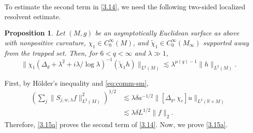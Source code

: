 \documentclass[11pt]{amsart}
\newcommand{\la}{\lambda}
\newtheorem{proposition}{Proposition}[section]
\begin{document}
To estimate the second term in \eqref{3.14}, we need the following two-sided localized resolvent estimate.
\begin{proposition}\label{keyeuc}
Let $(M,g)$ be an asymptotically Euclidean surface as above with nonpositive curvature, $\chi_1\in C_0^\infty(M)$, and $\tilde\chi_1\in C_0^\infty(M_\infty)$ supported away from the trapped set. Then, for $6<q<\infty$ and $\la\gg1$,
\begin{equation}\label{3.15a}
\|\chi_1(\Delta_g+\la^2+i\la/\log\la)^{-1}(\tilde\chi_1h)\|_{L^q(M)}
\lesssim\la^{\mu(q)-1}\|h\|_{L^2(M)}.
\end{equation}
\end{proposition}
First, by H\"older's inequality and \eqref{eq:comm-sm},
\begin{equation}\label{eq:Sw-exterior}
\begin{split}
\left(\sum_j\|S_{j,w,\la}f\|_{L^2(M)}^2\right)^{1/2}
&\lesssim\la\delta a^{-1/2}\|[\Delta_g,\chi_c]u\|_{L^2(\mathbb R\times M)}\\
&\lesssim\la\delta L^{1/2}\|f\|_2.
\end{split}
\end{equation}
Therefore, \eqref{3.15a} proves the second term of \eqref{3.14}. Now, we prove \eqref{3.15a}.
\end{document}
